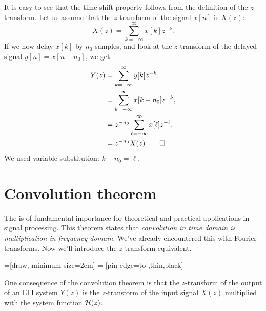 It is easy to see that the time-shift property follows from the
definition of the $z$-transform. Let us assume that the $z$-transform of
the signal $x[n]$ is $X(z)$:
\begin{equation}
  X(z) = \sum_{k=-\infty}^{\infty} x[k] z^{-k}.
\end{equation}
If we now delay $x[k]$ by $n_0$ samples, and look at the $z$-transform
of the delayed signal $y[n]=x[n-n_0]$, we get:
\begin{align}
  Y(z) & = \sum_{k=-\infty}^{\infty} y[k] z^{-k},                  \\
       & = \sum_{k=-\infty}^{\infty} x[k-n_0] z^{-k},              \\
       & = z^{-n_0}\sum_{\ell=-\infty}^{\infty} x[\ell] z^{-\ell}, \\
       & = z^{-n_0}X(z)\qed
\end{align}
We used variable substitution: $k-n_0 = \ell$.



\section{Convolution theorem}
The  is of fundamental
importance for theoretical and practical applications in signal
processing. This theorem states that \emph{convolution in time domain
  is multiplication in frequency domain}. We've already encountered
this with Fourier transforms. Now we'll introduce the $z$-transform
equivalent.

=[draw, minimum size=2em]  = [pin
edge={to-,thin,black}]
\begin{marginfigure}
  \begin{center}
  \end{center}
  \caption{One consequence of the convolution theorem is that the $z$-transform of the output of an LTI
    system $Y(z)$ is the $z$-transform of the input signal $X(z)$ multiplied with the system function $\mathcal{H}(z)$.}
\end{marginfigure}

